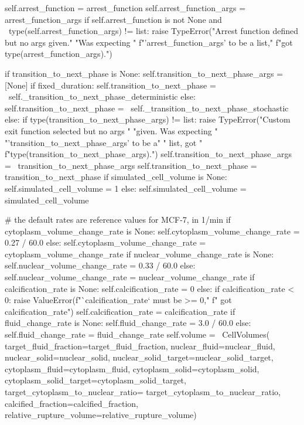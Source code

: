 \begin{python}
    self.arrest_function = arrest_function
    self.arrest_function_args = arrest_function_args
    if self.arrest_function is not None and \ 
      type(self.arrest_function_args) != list:
        raise TypeError("Arrest function defined but no args given."
                        "Was expecting "
                        f"'arrest_function_args' to be a list,"
                        f"got {type(arrest_function_args)}.")

    if transition_to_next_phase is None:
        self.transition_to_next_phase_args = [None]
        if fixed_duration:
            self.transition_to_next_phase = \ 
                self._transition_to_next_phase_deterministic
        else:
            self.transition_to_next_phase = \ 
                self._transition_to_next_phase_stochastic
    else:
        if type(transition_to_next_phase_args) != list:
            raise TypeError("Custom exit function selected but no args "
                            "given. Was expecting "
                            "'transition_to_next_phase_args' to be a"
                            " list, got "
                            f"{type(transition_to_next_phase_args)}.")
        self.transition_to_next_phase_args = \ 
            transition_to_next_phase_args
        self.transition_to_next_phase = transition_to_next_phase
    if simulated_cell_volume is None:
        self.simulated_cell_volume = 1
    else:
        self.simulated_cell_volume = simulated_cell_volume

    # the default rates are reference values for MCF-7, in 1/min
    if cytoplasm_volume_change_rate is None:
        self.cytoplasm_volume_change_rate = 0.27 / 60.0
    else:
        self.cytoplasm_volume_change_rate = cytoplasm_volume_change_rate
    if nuclear_volume_change_rate is None:
        self.nuclear_volume_change_rate = 0.33 / 60.0
    else:
        self.nuclear_volume_change_rate = nuclear_volume_change_rate
    if calcification_rate is None:
        self.calcification_rate = 0
    else:
        if calcification_rate < 0:
            raise ValueError(f"`calcification_rate` must be >= 0,"
                             f" got {calcification_rate}")
        self.calcification_rate = calcification_rate
    if fluid_change_rate is None:
        self.fluid_change_rate = 3.0 / 60.0
    else:
        self.fluid_change_rate = fluid_change_rate
    self.volume = \ 
        CellVolumes(
            target_fluid_fraction=target_fluid_fraction,
            nuclear_fluid=nuclear_fluid, 
            nuclear_solid=nuclear_solid, 
            nuclear_solid_target=nuclear_solid_target,
            cytoplasm_fluid=cytoplasm_fluid, 
            cytoplasm_solid=cytoplasm_solid,
            cytoplasm_solid_target=cytoplasm_solid_target,
            target_cytoplasm_to_nuclear_ratio=
                target_cytoplasm_to_nuclear_ratio, 
            calcified_fraction=calcified_fraction,
            relative_rupture_volume=relative_rupture_volume)

\end{python}

